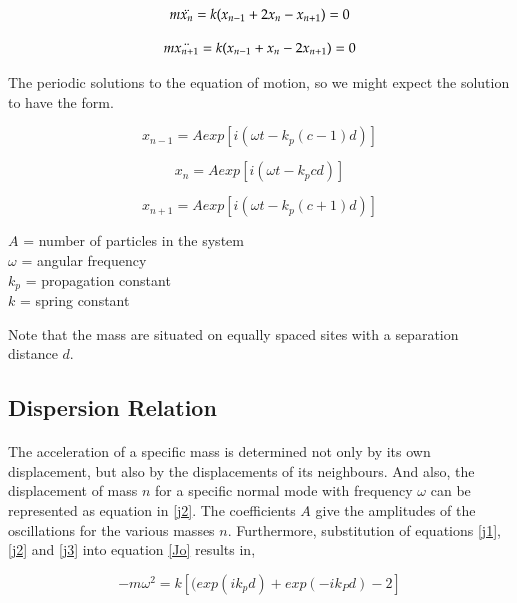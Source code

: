\begin{equation}
\label{Jo}
       m\Ddot{x_{n}} = k(x_{n-1}+2x_n - x_{n+1} )=0
\end{equation}

\begin{equation}
       m\Ddot{x_{n+1}} = k(x_{n-1}+ x_n - 2x_{n+1} )=0
\end{equation}

The periodic solutions to the equation of motion, so we might expect the solution to have the form.

\begin{equation}
\label{j1}
    x_{n-1} = Aexp[i(\omega t - k_p(c-1)d)]
\end{equation}

\begin{equation}
\label{j2}
    x_{n} = Aexp[i(\omega t - k_pcd)]
\end{equation}

\begin{equation}
\label{j3}
    x_{n+1} = Aexp[i(\omega t - k_p(c+1)d)]
\end{equation}

$A$ = number of particles in the system \\
$\omega$ = angular frequency \\
$k_p$ = propagation constant \\
$k$ = spring constant

Note that the mass are situated on equally spaced sites with a separation distance $d$. 

\subsection{Dispersion Relation}
\paragraph{}
The acceleration of a specific mass is determined not only by its own displacement, but also by the displacements of its neighbours. And also, the displacement of mass $n$ for a specific normal mode with frequency $\omega$ can be represented as  equation in \eqref{j2}. The coefficients $A$ give the amplitudes of the oscillations for the various masses $n$. Furthermore, substitution of equations \eqref{j1}, \eqref{j2} and \eqref{j3} into equation \eqref{Jo} results in,

\begin{equation}
    -m\omega^2 = k[(exp(ik_p d) + exp(-ik_P d)-2]
\end{equation}

